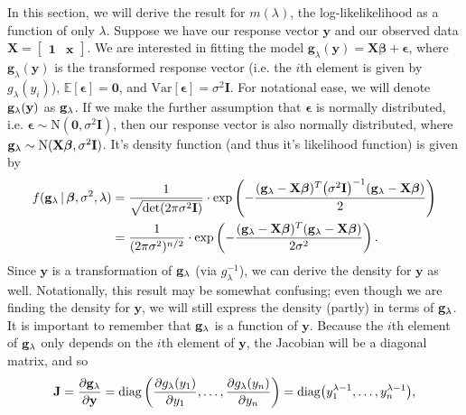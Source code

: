 \documentclass[10pt]{article}
\begin{document}
In this section, we will derive the result for \(m(\lambda)\), the log-likelikelihood as a function of only \(\lambda\).
Suppose we have our response vector \(\mathbf{y}\) and our observed data \(\mathbf{X} = \begin{bmatrix}
    \mathbf{1} & \mathbf{x}
\end{bmatrix}\). 
We are interested in fitting the model \(\mathbf{g}_{\lambda}(\mathbf{y}) = \mathbf{X}\bm{\beta} + \bm{\epsilon}\), where \(\mathbf{g}_{\lambda}(\mathbf{y})\)
is the transformed response vector (i.e. the \(i\)th element is given by \(g_{\lambda}(y_i)\)), \(\mathbb{E}[\bm{\epsilon}] = \mathbf{0}\), and 
\(\mathrm{Var}[\bm{\epsilon}] = \sigma^2 \mathbf{I}\). 
For notational ease, we will denote \(\mathbf{g}_{\lambda}(\mathbf{y})\) as \(\mathbf{g}_{\lambda}\). 
If we make the further assumption that \(\bm{\epsilon}\) is normally distributed, i.e. 
\(\bm{\epsilon} \sim \mathrm{N}(\mathbf{0}, \sigma^2 \mathbf{I})\), then our response vector is also normally distributed, where
\(\mathbf{g}_{\lambda} \sim \mathrm{N}(\mathbf{X}\bm{\beta}, \sigma^2 \mathbf{I})\). It's density function (and thus it's likelihood function) is given by 
\begin{align*}
    f(\mathbf{g}_{\lambda} \,|\, \bm{\beta}, \sigma^2, \lambda)
    &= \frac{1}{\sqrt{\mathrm{det}(2 \pi \sigma^2 \mathbf{I})}} \cdot \mathrm{exp} \left( - \frac{(\mathbf{g}_{\lambda} - \mathbf{X}\bm{\beta})^T \big( \sigma^2 \mathbf{I} \big)^{-1} (\mathbf{g}_{\lambda} - \mathbf{X}\bm{\beta})}{2} \right) \\
    &= \frac{1}{(2\pi\sigma^2)^{n/2}} \cdot \mathrm{exp} \left( - \frac{(\mathbf{g}_{\lambda} - \mathbf{X}\bm{\beta})^T (\mathbf{g}_{\lambda} - \mathbf{X}\bm{\beta})}{2 \sigma^2} \right).
\end{align*}
Since \(\mathbf{y}\) is a transformation of \(\mathbf{g}_{\lambda}\) (via \(g_{\lambda}^{-1}\)), we can derive the density for \(\mathbf{y}\) as well. Notationally, this result may be somewhat 
confusing; even though we are finding the density for \(\mathbf{y}\), we will still express the density (partly) in terms of \(\mathbf{g}_{\lambda}\). It is important
to remember that \(\mathbf{g}_{\lambda}\) is a function of \(\mathbf{y}\). Because the \(i\)th element of \(\mathbf{g}_{\lambda}\) only depends on the \(i\)th element of \(\mathbf{y}\), the Jacobian
will be a diagonal matrix, and so 
\begin{align*}
    \mathbf{J}
    = \frac{\partial \mathbf{g}_{\lambda}}{\partial \mathbf{y}}
    = \mathrm{diag} \left( \frac{\partial g_{\lambda}(y_1)}{\partial y_1}, \ldots, \frac{\partial g_{\lambda}(y_n)}{\partial y_n} \right)
    = \mathrm{diag} \big( y_1^{\lambda - 1}, \ldots, y_n^{\lambda - 1} \big), 
\end{align*}
\end{document}
